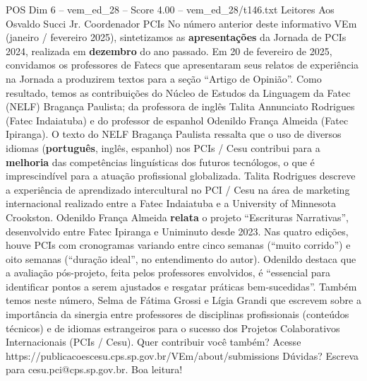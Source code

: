 \begin{textsample}{POS Dim 6 – vem\_ed\_28 – Score 4.00 – vem\_ed\_28/t146.txt}  \label{ex:f6_pos_025}
Leitores Aos Osvaldo Succi Jr.
Coordenador PCIs No número anterior deste informativo VEm (janeiro / fevereiro 2025), sintetizamos as \textbf{apresentações} da Jornada de PCIs 2024, realizada em \textbf{dezembro} do ano passado.
Em 20 de fevereiro de 2025, convidamos os professores de Fatecs que apresentaram seus relatos de experiência na Jornada a produzirem textos para a seção “Artigo de Opinião”.
Como resultado, temos as contribuições do Núcleo de Estudos da Linguagem da Fatec (NELF) Bragança Paulista; da professora de inglês Talita Annunciato Rodrigues (Fatec Indaiatuba) e do professor de espanhol Odenildo França Almeida (Fatec Ipiranga).
O texto do NELF Bragança Paulista ressalta que o uso de diversos idiomas (\textbf{português}, inglês, espanhol) nos PCIs / Cesu contribui para a \textbf{melhoria} das competências linguísticas dos futuros tecnólogos, o que é imprescindível para a atuação profissional globalizada.
Talita Rodrigues descreve a experiência de aprendizado intercultural no PCI / Cesu na área de marketing internacional realizado entre a Fatec Indaiatuba e a University of Minnesota Crookston.
Odenildo França Almeida \textbf{relata} o projeto “Escrituras Narrativas”, desenvolvido entre Fatec Ipiranga e Uniminuto desde 2023.
Nas quatro edições, houve PCIs com cronogramas variando entre cinco semanas (“muito corrido”) e oito semanas (“duração ideal”, no entendimento do autor).
Odenildo destaca que a avaliação pós-projeto, feita pelos professores envolvidos, é “essencial para identificar pontos a serem ajustados e resgatar práticas bem-sucedidas”.
Também temos neste número, Selma de Fátima Grossi e Lígia Grandi que escrevem sobre a importância da sinergia entre professores de disciplinas profissionais (conteúdos técnicos) e de idiomas estrangeiros para o sucesso dos Projetos Colaborativos Internacionais (PCIs / Cesu).
Quer contribuir você também?
Acesse https://publicacoescesu.cps.sp.gov.br/VEm/about/submissions Dúvidas?
Escreva para cesu.pci@cps.sp.gov.br.
Boa leitura!

\end{textsample}
